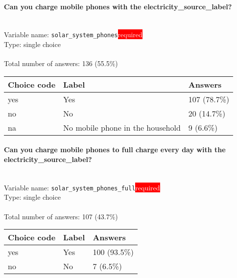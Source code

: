 \documentclass[11.5pt, a4paper]{scrartcl}
\begin{document}
\paragraph{Can you charge mobile phones with the electricity\_source\_label?}
\  \\Variable name: \texttt{solar\_system\_phones}\hfill\colorbox{red}{\small{\textcolor{white}{required}}}\\
 Type: single choice\\
\\Total number of answers: 136 (55.5\%)
\\[0.2em] \begin{tabular}{p{4cm}|p{8cm}|p{3cm}}
Choice code & Label & Answers \\
\hline
yes & Yes& \cellcolor{color3}107 (78.7\%)\\
\cellcolor{mygray} no & \cellcolor{mygray}No  & \cellcolor{color0}20 (14.7\%)\\
na & No mobile phone in the household& \cellcolor{color0}9 (6.6\%)\\
\end{tabular}
\paragraph{Can you charge mobile phones to full charge every day with the electricity\_source\_label?}
\  \\Variable name: \texttt{solar\_system\_phones\_full}\hfill\colorbox{red}{\small{\textcolor{white}{required}}}\\
 Type: single choice\\
\\Total number of answers: 107 (43.7\%)
\\[0.2em] \begin{tabular}{p{4cm}|p{8cm}|p{3cm}}
Choice code & Label & Answers \\
\hline
yes & Yes& \cellcolor{color4}100 (93.5\%)\\
\cellcolor{mygray} no & \cellcolor{mygray}No & \cellcolor{color0}7 (6.5\%)\\
\end{tabular}
\end{document}
